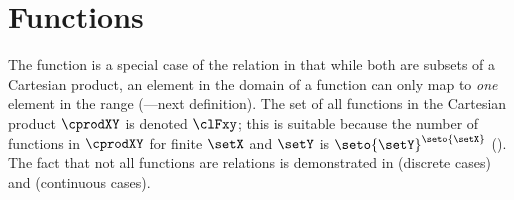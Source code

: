 
\section{Functions}
The function is a special case of the relation in that while both are subsets of
a Cartesian product, an element in the domain of a function can only map to
\emph{one} element in the range (---next definition).
The set of all functions in the Cartesian product $\cprodXY$ is
denoted $\clFxy$;
this is suitable because the number of functions in $\cprodXY$
for finite $\setX$ and $\setY$ is $\seto{\setY}^\seto{\setX}$ ().
The fact that not all functions are relations is demonstrated in
 (discrete cases) and  (continuous cases).
